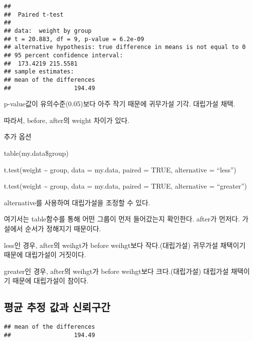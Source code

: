 \documentclass[
]{article}
\newenvironment{Shaded}{\begin{snugshade}}{\end{snugshade}}
\newcommand{\NormalTok}[1]{#1}
\newcommand{\SpecialCharTok}[1]{\textcolor[rgb]{0.00,0.00,0.00}{#1}}
\begin{document}
\begin{verbatim}
## 
##  Paired t-test
## 
## data:  weight by group
## t = 20.883, df = 9, p-value = 6.2e-09
## alternative hypothesis: true difference in means is not equal to 0
## 95 percent confidence interval:
##  173.4219 215.5581
## sample estimates:
## mean of the differences 
##                  194.49
\end{verbatim}

p-value값이 유의수준(0.05)보다 아주 작기 때문에 귀무가설 기각. 대립가설 채택.

따라서, before, after의 weight 차이가 있다.

추가 옵션

table(my.data\$group)

t.test(weight \textasciitilde{} group, data = my.data, paired = TRUE, alternative = ``less'')

t.test(weight \textasciitilde{} group, data = my.data, paired = TRUE, alternative = ``greater'')

alternative를 사용하여 대립가설을 조정할 수 있다.

여기서는 table함수를 통해 어떤 그룹이 먼저 들어갔는지 확인한다. after가 먼저다. 가설에서 순서가 정해지기 때문이다.

less인 경우, after의 weihgt가 before weihgt보다 작다.(대립가설) 귀무가설 채택이기 때문에 대립가설이 거짓이다.

greater인 경우, after의 weihgt가 before weihgt보다 크다.(대립가설) 대립가설 채택이기 때문에 대립가설이 참이다.

\hypertarget{uxd3c9uxade0-uxcd94uxc815-uxac12uxacfc-uxc2e0uxb8b0uxad6cuxac04}{%
\subsection{평균 추정 값과 신뢰구간}\label{uxd3c9uxade0-uxcd94uxc815-uxac12uxacfc-uxc2e0uxb8b0uxad6cuxac04}}

\begin{Shaded}
\end{Shaded}

\begin{verbatim}
## mean of the differences 
##                  194.49
\end{verbatim}

\begin{Shaded}
\end{Shaded}
\end{document}

